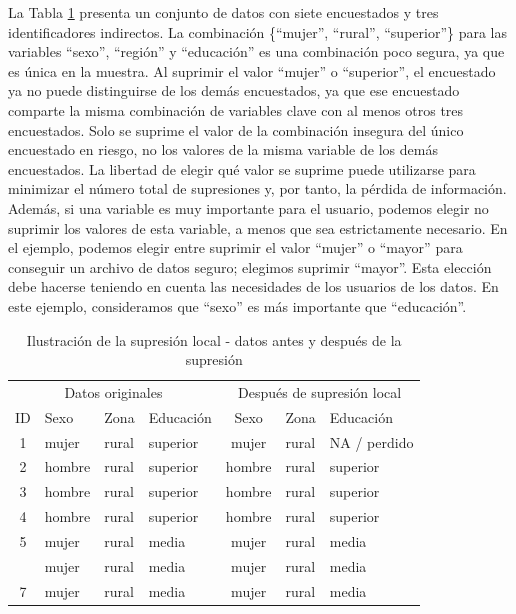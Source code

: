 \documentclass[]{book}
\theoremstyle{definition}
\theoremstyle{definition}
\theoremstyle{definition}
\theoremstyle{definition}
\theoremstyle{remark}
\begin{document}
La Tabla \ref{tab:Tabla9} presenta un conjunto de datos con siete encuestados y tres identificadores indirectos. La combinación \{``mujer'', ``rural'', ``superior''\} para las variables ``sexo'', ``región'' y ``educación'' es una combinación poco segura, ya que es única en la muestra. Al suprimir el valor ``mujer'' o ``superior'', el encuestado ya no puede distinguirse de los demás encuestados, ya que ese encuestado comparte la misma combinación de variables clave con al menos otros tres encuestados. Solo se suprime el valor de la combinación insegura del único encuestado en riesgo, no los valores de la misma variable de los demás encuestados. La libertad de elegir qué valor se suprime puede utilizarse para minimizar el número total de supresiones y, por tanto, la pérdida de información. Además, si una variable es muy importante para el usuario, podemos elegir no suprimir los valores de esta variable, a menos que sea estrictamente necesario. En el ejemplo, podemos elegir entre suprimir el valor ``mujer'' o ``mayor'' para conseguir un archivo de datos seguro; elegimos suprimir ``mayor''. Esta elección debe hacerse teniendo en cuenta las necesidades de los usuarios de los datos. En este ejemplo, consideramos que ``sexo'' es más importante que ``educación''.

\begin{table}

\caption{\label{tab:Tabla9}\label{tab:Tabla9}Ilustración de la supresión local - datos antes y después de la supresión}
\centering
\begin{tabular}[t]{clllcll}
\toprule
\multicolumn{4}{c}{Datos originales} & \multicolumn{3}{c}{Después de supresión local} \\
\cmidrule(l{3pt}r{3pt}){1-4} \cmidrule(l{3pt}r{3pt}){5-7}
ID & Sexo & Zona & Educación & Sexo & Zona & Educación\\
\midrule
1 & mujer & rural & superior & mujer & rural & NA / perdido\\
2 & hombre & rural & superior & hombre & rural & superior\\
3 & hombre & rural & superior & hombre & rural & superior\\
4 & hombre & rural & superior & hombre & rural & superior\\
5 & mujer & rural & media & mujer & rural & media\\
\addlinespace
6 & mujer & rural & media & mujer & rural & media\\
7 & mujer & rural & media & mujer & rural & media\\
\bottomrule
\end{tabular}
\end{table}
\end{document}
